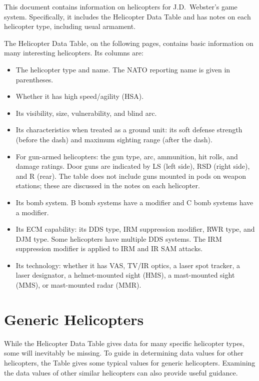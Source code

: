 \documentclass[10pt]{article}
\begin{document}

This document contains information on helicopters for J.D.\ Webster's {\AirPow} game system. Specifically, it includes the Helicopter Data Table and has notes on each helicopter type, including usual armament.

The Helicopter Data Table, on the following pages, contains basic information on many interesting helicopters. Its columns are:
\begin{itemize}
  \item The helicopter type and name. The NATO reporting name is given in parentheses. 
  \item Whether it has high speed/agility (HSA).
  \item Its visibility, size, vulnerability, and blind arc.
  \item Its characteristics when treated as a ground unit: its soft defense strength (before the dash) and maximum sighting range (after the dash).
  \item For gun-armed helicopters: the gun type, arc, ammunition, hit rolls, and damage ratings. Door guns are indicated by LS (left side), RSD (right side), and R (rear). The table does not include guns mounted in pods on weapon stations; these are discussed in the notes on each helicopter.
  \item Its bomb system. B bomb systems have a  modifier and C bomb systems have a  modifier.
  \item Its ECM capability: its DDS type, IRM suppression modifier, RWR type, and DJM type. Some helicopters have multiple DDS systems. The IRM suppression modifier is applied to IRM and IR SAM attacks.
  \item Its technology: whether it has VAS, TV/IR optics, a laser spot tracker, a laser designator, a helmet-mounted sight (HMS), a mast-mounted sight (MMS), or mast-mounted radar (MMR).
\end{itemize}


\section{Generic Helicopters}

While the Helicopter Data Table gives data for many specific helicopter types, some will inevitably be missing. To guide in determining data values for other helicopters, the Table gives some typical values for generic helicopters. Examining the data values of other similar helicopters can also provide useful guidance.
\end{document}
